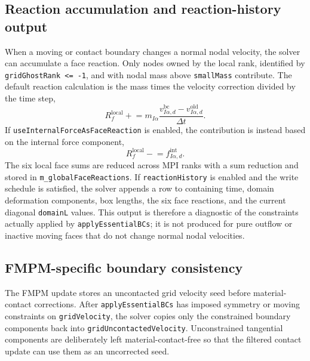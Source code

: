 \subsection{Reaction accumulation and reaction-history output}
\label{subsec:bc-reactions-internals}

When a moving or contact boundary changes a normal nodal velocity, the solver can accumulate a face reaction.  Only nodes owned by the local rank, identified by \texttt{gridGhostRank <= -1}, and with nodal mass above \texttt{smallMass} contribute.  The default reaction calculation is the mass times the velocity correction divided by the time step,
\begin{equation}
  R_f^{\mathrm{local}} \mathrel{+}= m_{I\alpha}\frac{v_{I\alpha,d}^{\mathrm{bc}}-v_{I\alpha,d}^{\mathrm{old}}}{\Delta t}.
  \label{eq:bc-reaction-momentum}
\end{equation}
If \texttt{useInternalForceAsFaceReaction} is enabled, the contribution is instead based on the internal force component,
\begin{equation}
  R_f^{\mathrm{local}} \mathrel{-}= f_{I\alpha,d}^{\mathrm{int}}.
  \label{eq:bc-reaction-internal-force}
\end{equation}
The six local face sums are reduced across MPI ranks with a sum reduction and stored in \texttt{m\_globalFaceReactions}.  If \texttt{reactionHistory} is enabled and the write schedule is satisfied, the solver appends a row to  containing time, domain deformation components, box lengths, the six face reactions, and the current diagonal \texttt{domainL} values.  This output is therefore a diagnostic of the constraints actually applied by \texttt{applyEssentialBCs}; it is not produced for pure outflow or inactive moving faces that do not change normal nodal velocities.

\subsection{FMPM-specific boundary consistency}
\label{subsec:bc-fmpm-internals}

The FMPM update stores an uncontacted grid velocity seed before material-contact corrections.  After \texttt{applyEssentialBCs} has imposed symmetry or moving constraints on \texttt{gridVelocity}, the solver copies only the constrained boundary components back into \texttt{gridUncontactedVelocity}.  Unconstrained tangential components are deliberately left material-contact-free so that the filtered contact update can use them as an uncorrected seed.

